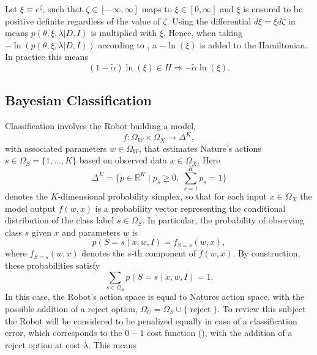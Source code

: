 \begin{example}
	Let $\xi \equiv e^\zeta$, such that $\zeta\in [-\infty,\infty]$ maps to $\xi\in[0,\infty]$ and $\xi$ is ensured to be positive definite regardless of the value of $\zeta$. Using the differential $d\xi =  \xi d\zeta$ in  means $p(\theta,\xi,\lambda|D,I)$ is multiplied with $\xi$. Hence, when taking $-\ln(p(\theta,\xi,\lambda|D,I))$ according to , a $-\ln(\xi)$ is added to the Hamiltonian. In practice this means
	\begin{equation}
		(1-\tilde{\alpha})\ln(\xi)\in H\Rightarrow -\tilde{\alpha}\ln(\xi).
	\end{equation} 	
\end{example}

\subsection{Bayesian Classification}
\label{chp:baycl}
Classification involves the Robot building a model,
\begin{equation}
	f: \Omega_W \times \Omega_X \to \Delta^K,
\end{equation}
with associated parameters $w \in \Omega_W$, that estimates Nature's actions $s\in \Omega_S= \{1,\dots,K\}$ based on observed data $x\in \Omega_X$. Here
\begin{equation}
	\Delta^K = \{p \in \mathbb{R}^K \mid p_s \geq 0,\; \sum_{s=1}^K p_s = 1\}
\end{equation} 
denotes the $K$-dimensional probability simplex, so that for each input $x \in \Omega_X$ the model output $f(w,x)$ is a probability vector representing the conditional distribution of the class label $s \in \Omega_S $. In particular, the probability of observing class $s$ given $x$ and parameters $w$ is 
\begin{equation}
	p(S = s \mid x, w, I) = f_{S=s}(w,x),
	\label{f_dist2}
\end{equation}
where $f_{S=s}(w,x)$ denotes the $s$-th component of $f(w,x)$. 
By construction, these probabilities satisfy
\begin{equation}
	\sum_{s \in \Omega_S} p(S = s \mid x, w, I) = 1.
\end{equation}
In this case, the Robot's action space is equal to Natures action space, with the possible addition of a reject option, $\Omega_U=\Omega_S\cup \{\operatorname{reject}\}$. To review this subject the Robot will be considered to be penalized equally in case of a classification error, which corresponds to the $0-1$ cost function (), with the addition of a reject option at cost $\lambda$. This means
